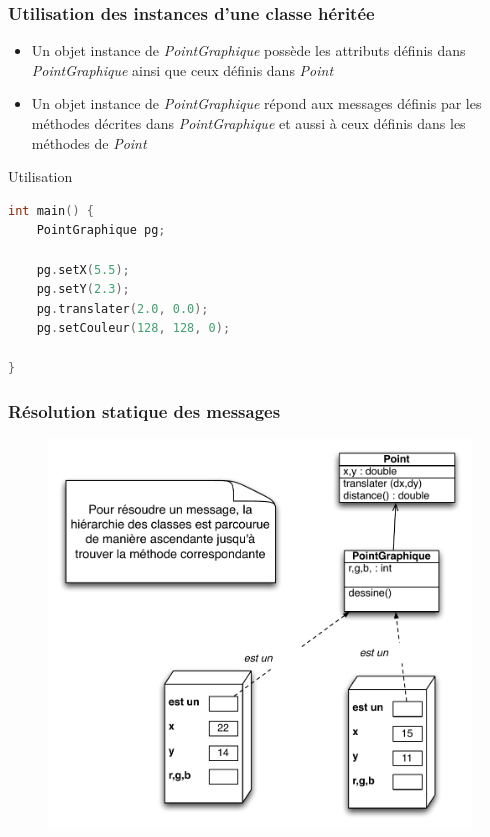 \begin{frame}[fragile]
\frametitle{Utilisation des instances d'une classe héritée}
\begin{itemize}
	\item Un objet instance de \emph{PointGraphique} possède les attributs définis dans \emph{PointGraphique} ainsi que ceux définis dans \emph{Point}
	\item Un  objet instance de \emph{PointGraphique} répond aux messages définis par les méthodes décrites dans \emph{PointGraphique} et aussi à ceux définis dans les méthodes de \emph{Point}
\end{itemize}
\begin{exampleblock}{Utilisation}
\begin{lstlisting}[language=C++]
int main() {
    PointGraphique pg;

    pg.setX(5.5);
    pg.setY(2.3);
    pg.translater(2.0, 0.0);
    pg.setCouleur(128, 128, 0);

}
\end{lstlisting}
\end{exampleblock}
\end{frame}

\begin{frame}[fragile]
\frametitle{Résolution statique des messages}
\begin{figure}[htbp]
    \begin{center}
      \includegraphics[scale=.42]{fig/resolution.pdf}
    \end{center}
  \end{figure}
\end{frame}


